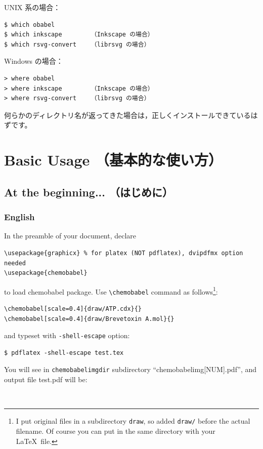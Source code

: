 \documentclass[12pt]{jsarticle}
\begin{document}
UNIX 系の場合：
\begin{verbatim}
$ which obabel
$ which inkscape        （Inkscape の場合）
$ which rsvg-convert    （librsvg の場合）
\end{verbatim}

Windows の場合：
\begin{verbatim}
> where obabel
> where inkscape        （Inkscape の場合）
> where rsvg-convert    （librsvg の場合）
\end{verbatim}

何らかのディレクトリ名が返ってきた場合は，正しくインストールできているはずです。

\clearpage

\section{Basic Usage （基本的な使い方）} \label{basic}

\subsection{At the beginning... （はじめに）}

\subsubsection{English}
In the preamble of your document, declare
\begin{verbatim}
\usepackage{graphicx} % for platex (NOT pdflatex), dvipdfmx option needed
\usepackage{chemobabel}
\end{verbatim}
to load \textsf{chemobabel} package. Use \verb|\chemobabel| command as follows\footnote{I put original files in a subdirectory \texttt{draw}, so added \texttt{draw/} before the actual filename. Of course you can put in the same directory with your \LaTeX\ file.}:
\begin{verbatim}
\chemobabel[scale=0.4]{draw/ATP.cdx}{}
\chemobabel[scale=0.4]{draw/Brevetoxin A.mol}{}
\end{verbatim}
and typeset with \verb|-shell-escape| option:
\begin{verbatim}
$ pdflatex -shell-escape test.tex
\end{verbatim}
You will see in \verb|chemobabelimgdir| subdirectory ``chemobabelimg[NUM].pdf'', and output file test.pdf will be:
\begin{figure}[h]
  \centering
   \\
\end{figure}
\end{document}
